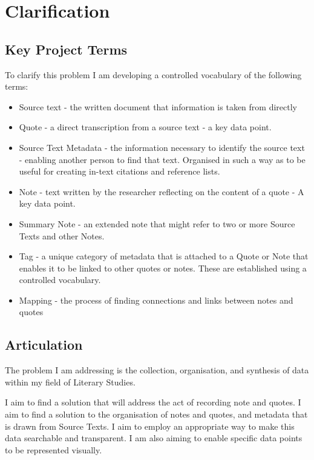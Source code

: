 \documentclass{article}
\begin{document}
\pagebreak

\section{Clarification}
\subsection{Key Project Terms}

To clarify this problem I am developing a controlled vocabulary of the following terms:
\begin{itemize}
    \item Source text - the written document that information is taken from directly
    \item Quote - a direct transcription from a source text - a key data point.
    \item Source Text Metadata - the information necessary to identify the source text - enabling another person to find that text. Organised in such a way as to be useful for creating in-text citations and reference lists.
    \item Note - text written by the researcher reflecting on the content of a quote - A key data point.
    \item Summary Note - an extended note that might refer to two or more Source Texts and other Notes. 
    \item Tag - a unique category of metadata that is attached to a Quote or Note that enables it to be linked to other quotes or notes. These are established using a controlled vocabulary.
    \item Mapping - the process of finding connections and links between notes and quotes
\end{itemize}

\subsection{Articulation}
The problem I am addressing is the collection, organisation, and synthesis of data within my field of Literary Studies. 

I aim to find a solution that will address the act of recording note and quotes. I aim to find a solution to the organisation of notes and quotes, and metadata that is drawn from Source Texts.  I aim to employ an appropriate way to make this data searchable and transparent. I am also aiming to enable specific data points to be represented visually. 
\pagebreak
\end{document}
